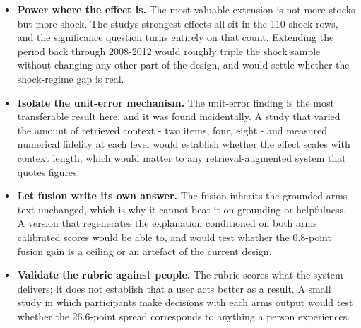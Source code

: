 \begin{itemize}
\item
  \textbf{Power where the effect is.} The most valuable extension is not
  more stocks but more shock. The study\textquotesingle s strongest
  effects all sit in the 110 shock rows, and the significance question
  turns entirely on that count. Extending the period back through
  2008-2012 would roughly triple the shock sample without changing any
  other part of the design, and would settle whether the shock-regime
  gap is real.
\item
  \textbf{Isolate the unit-error mechanism.} The unit-error finding is
  the most transferable result here, and it was found incidentally. A
  study that varied the amount of retrieved context - two items, four,
  eight - and measured numerical fidelity at each level would establish
  whether the effect scales with context length, which would matter to
  any retrieval-augmented system that quotes figures.
\item
  \textbf{Let fusion write its own answer.} The fusion inherits the
  grounded arm\textquotesingle s text unchanged, which is why it cannot
  beat it on grounding or helpfulness. A version that regenerates the
  explanation conditioned on both arms\textquotesingle{} calibrated
  scores would be able to, and would test whether the 0.8-point fusion
  gain is a ceiling or an artefact of the current design.
\item
  \textbf{Validate the rubric against people.} The rubric scores what
  the system delivers; it does not establish that a user acts better as
  a result. A small study in which participants make decisions with each
  arm\textquotesingle s output would test whether the 26.6-point spread
  corresponds to anything a person experiences.
\end{itemize}

\nocite{*}
